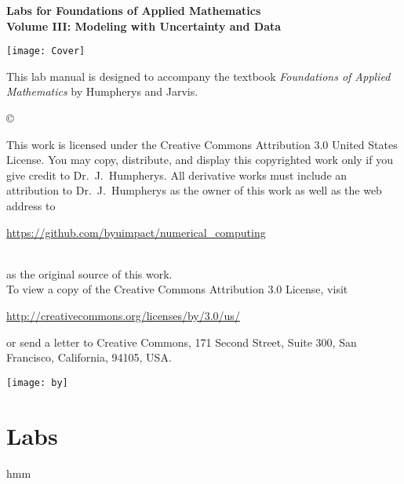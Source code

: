 \documentclass[nociteref]{SIAM-GH-book}
\begin{document}
\thispagestyle{empty}
\begin{center}
{\huge \bf Labs for Foundations of Applied Mathematics} \\
\vspace{5mm}
{\Large \bf Volume III: Modeling with
Uncertainty and Data}
\vspace{20mm}

\texttt{[image: Cover]}
\end{center}
\frontmatter




\begin{thepreface}
This lab manual is designed to accompany the textbook \emph{Foundations of Applied Mathematics} by Humpherys and Jarvis.

\vfill
\copyright{This work is licensed under the Creative Commons Attribution 3.0 United States
License.  You may copy, distribute, and display this copyrighted work only if you give
credit to Dr.~J.~Humpherys. All derivative works must include an attribution to Dr.~J.~Humpherys as the owner of this work as well as the web address to
\\\centerline{\url{https://github.com/byuimpact/numerical_computing}}\\ as the original source of
this
work.\\To view a copy of the Creative Commons Attribution 3.0 License,
visit\\\centerline{\url{http://creativecommons.org/licenses/by/3.0/us/}} or send a letter to
Creative Commons, 171 Second Street, Suite 300, San Francisco, California, 94105, USA.}

\vfill
\centering\texttt{[image: by]}
\vfill
\end{thepreface}

\setcounter{tocdepth}{1}
\tableofcontents

\mainmatter

\part{Labs}
%
%
%
%
%
{hmm}
\end{document}
